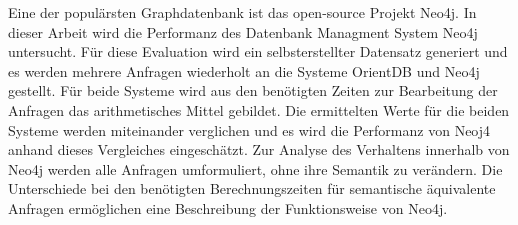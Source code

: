 Eine der populärsten Graphdatenbank ist das open-source Projekt Neo4j\parencite{francis2018cypher}.  \newline In dieser Arbeit wird die Performanz des Datenbank Managment System Neo4j untersucht. Für diese Evaluation wird ein selbsterstellter Datensatz generiert und es werden mehrere Anfragen wiederholt an die Systeme OrientDB und Neo4j gestellt. Für beide Systeme wird aus den benötigten Zeiten zur Bearbeitung der Anfragen das arithmetisches Mittel gebildet. Die ermittelten Werte für die beiden Systeme werden miteinander verglichen und es wird die Performanz von Neoj4 anhand dieses Vergleiches eingeschätzt. Zur Analyse des Verhaltens innerhalb von Neo4j werden alle Anfragen umformuliert, ohne ihre Semantik zu verändern. Die Unterschiede bei den benötigten Berechnungszeiten für semantische äquivalente Anfragen ermöglichen eine Beschreibung der Funktionsweise von Neo4j. 

